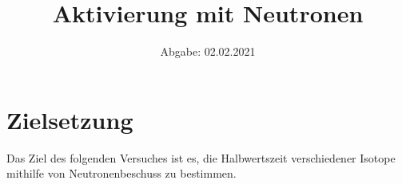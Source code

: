 
\usepackage{parskip}

\subject{D702}
\title{Aktivierung mit Neutronen}
\date{
    Abgabe: 02.02.2021
}



\maketitle
\thispagestyle{empty}
\tableofcontents
\newpage

\section{Zielsetzung}

    Das Ziel des folgenden Versuches ist es,
    die Halbwertszeit verschiedener Isotope mithilfe von Neutronenbeschuss zu bestimmen.


\clearpage


\clearpage


\clearpage


\clearpage

\printbibliography


